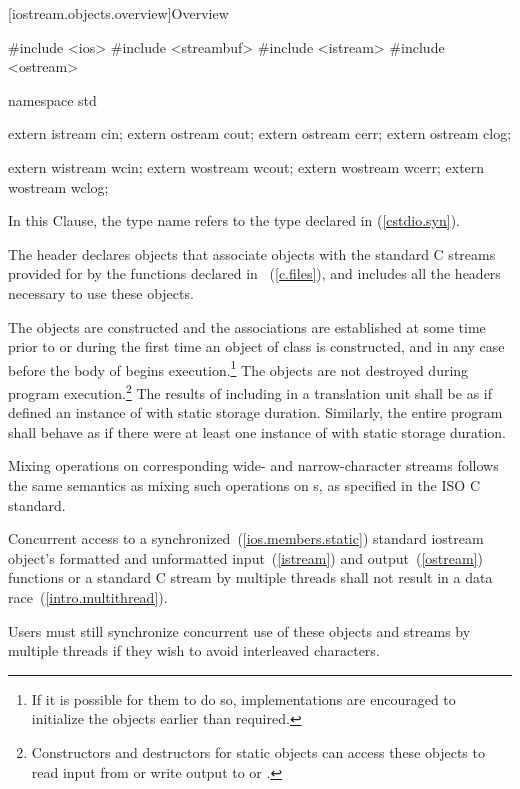 [iostream.objects.overview]{Overview}

%

\begin{codeblock}
#include <ios>
#include <streambuf>
#include <istream>
#include <ostream>

namespace std {
  extern istream cin;
  extern ostream cout;
  extern ostream cerr;
  extern ostream clog;

  extern wistream wcin;
  extern wostream wcout;
  extern wostream wcerr;
  extern wostream wclog;
}
\end{codeblock}

\pnum
In this Clause, the type name  refers to
the type
declared in
%
(\ref{cstdio.syn}).

\pnum
The header
declares objects that associate objects with the
standard C streams provided for by the functions declared in
~(\ref{c.files}), and includes all the headers necessary to use
these objects.
%

\pnum
The objects are constructed and the associations are established at some
time prior to or during the first time an object of class
 is constructed, and in any case before the body
of  begins execution.\footnote{If it is possible for them to do so, implementations are encouraged to
initialize the objects earlier than required.}
The objects are not destroyed during program execution.\footnote{Constructors and destructors for static objects can
access these objects to read input from
or write output to
or
.
}
The results of including  in a translation unit shall be as if
 defined an instance of  with static
storage duration. Similarly, the entire program shall behave as if there were at least
one instance of  with static storage duration.

\pnum
Mixing operations on corresponding wide- and narrow-character streams
follows the same semantics as mixing such operations on
s,
as specified in the ISO C standard.

\pnum
Concurrent access to a synchronized~(\ref{ios.members.static}) standard iostream object's formatted and unformatted input~(\ref{istream}) and output~(\ref{ostream}) functions or a standard C stream by multiple threads shall not result in a data race~(\ref{intro.multithread}). \begin{note} Users must still synchronize concurrent use of these objects and streams by multiple threads if they wish to avoid interleaved characters. \end{note}


